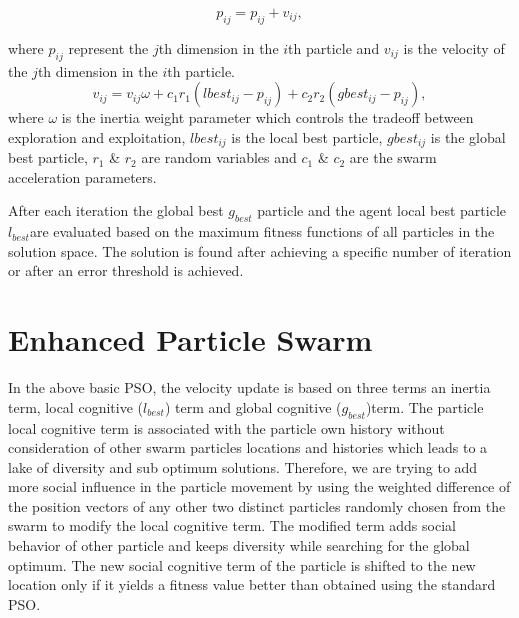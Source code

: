 \documentclass[10pt]{article}
\begin{document}
\begin{equation}
p_{ij}=p_{ij}+v_{ij},
\label{eq:Swarm1}
\end{equation}
 
where $p_{ij}$ represent the $j$th dimension in the $i$th particle and $v_{ij}$ is the velocity of the $j$th dimension in the $i$th particle.
 \begin{equation}
v_{ij}  = v_{ij} \omega + c_1 r_1 (lbest_{ij}  - p_{ij} ) + c_2 r_2 (gbest_{ij}  - p_{ij} ),
\label{eq:Swarm}
\end{equation}
 where $\omega$ is the inertia weight parameter which controls the tradeoff between exploration and exploitation,  $lbest_{ij}$ is the local best particle, $gbest_{ij}$ is the global best particle, $r_1$ \& $r_2$ are random variables and $c_1$ \& $c_2$ are the swarm acceleration parameters.  
 
 After each iteration the global best $g_{best}$ particle and the agent local best particle $l_{best}$are evaluated based on the maximum fitness functions of all particles in the solution space. The solution is found after achieving a specific number of iteration or after an error threshold is achieved.

\section{Enhanced Particle Swarm}
\label{sec:EnhancedSwarmAlgorithm}
In the above basic PSO, the velocity update is based on three terms an inertia term, local cognitive ($l_{best}$) term and global cognitive ($g_{best}$)term. The particle local cognitive term is associated with the particle own history without consideration of other swarm particles locations and histories which leads to a lake of diversity and sub optimum solutions. Therefore, we are trying to add more social influence in the particle movement by using the weighted difference of the position vectors of any other two distinct particles randomly chosen from the swarm to modify the local cognitive term. The modified term adds social behavior of other particle and keeps diversity while searching for the global optimum. The new social cognitive term of the particle is shifted to the new location only if it yields a fitness value better than obtained using the standard PSO\cite{stockPaper}.
\end{document}

